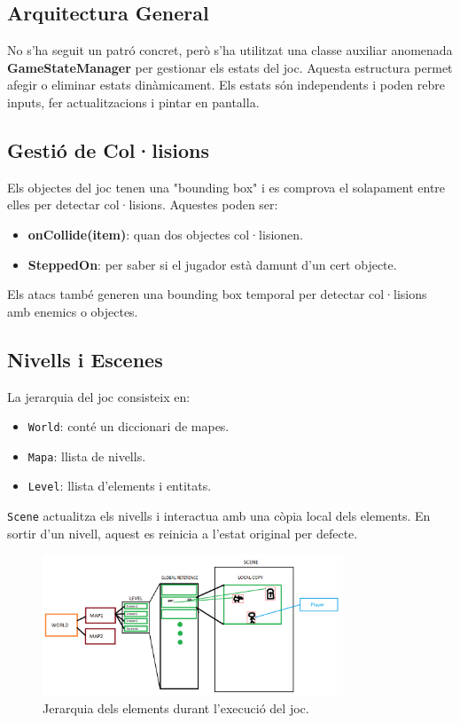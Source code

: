 \documentclass[a4paper,12pt]{article}
\begin{document}
\subsection{Arquitectura General}
No s'ha seguit un patró concret, però s'ha utilitzat una classe auxiliar anomenada \textbf{GameStateManager} per gestionar els estats del joc. Aquesta estructura permet afegir o eliminar estats dinàmicament. Els estats són independents i poden rebre inputs, fer actualitzacions i pintar en pantalla.

\subsection{Gestió de Col·lisions}
Els objectes del joc tenen una "bounding box" i es comprova el solapament entre elles per detectar col·lisions. Aquestes poden ser:
\begin{itemize}
    \item \textbf{onCollide(item)}: quan dos objectes col·lisionen.
    \item \textbf{SteppedOn}: per saber si el jugador està damunt d'un cert objecte.
\end{itemize}
Els atacs també generen una bounding box temporal per detectar col·lisions amb enemics o objectes.

\subsection{Nivells i Escenes}
La jerarquia del joc consisteix en:
\begin{itemize}
    \item \texttt{World}: conté un diccionari de mapes.
    \item \texttt{Mapa}: llista de nivells.
    \item \texttt{Level}: llista d'elements i entitats.
\end{itemize}
\texttt{Scene} actualitza els nivells i interactua amb una còpia local dels elements. En sortir d'un nivell, aquest es reinicia a l'estat original per defecte.

\begin{figure}[ht!]
    \centering
    \includegraphics[width=0.8\textwidth]{../imgs/global_to_local.png}
    \caption{Jerarquia dels elements durant l'execució del joc.}
    \label{fig:global_to_local}
\end{figure}
\end{document}
